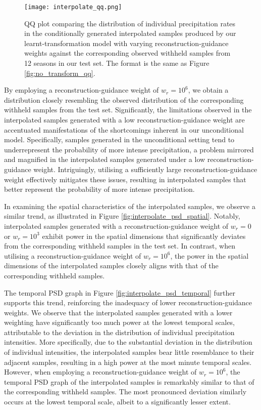 \documentclass[ oneside,%
                    author={George Herbert},
                    degree={MSci},
                     title={Diffusion Models for Time-Evolving Precipitation Fields},
                  subtitle={}]{dissertation}
\begin{document}
\begin{figure}[htbp]
      \centering
      \texttt{[image: interpolate\_qq.png]}
      \caption{QQ plot comparing the distribution of individual precipitation rates in the conditionally generated interpolated samples produced by our learnt-transformation model with varying reconstruction-guidance weights against the corresponding observed withheld samples from 12 seasons in our test set. The format is the same as Figure \ref{fig:no_transform_qq}.}
      \label{fig:interpolate_qq}
\end{figure}

By employing a reconstruction-guidance weight of $w_r=10^6$, we obtain a distribution closely resembling the observed distribution of the corresponding withheld samples from the test set. Significantly, the limitations observed in the interpolated samples generated with a low reconstruction-guidance weight are accentuated manifestations of the shortcomings inherent in our unconditional model. Specifically, samples generated in the unconditional setting tend to underrepresent the probability of more intense precipitation, a problem mirrored and magnified in the interpolated samples generated under a low reconstruction-guidance weight. Intriguingly, utilising a sufficiently large reconstruction-guidance weight effectively mitigates these issues, resulting in interpolated samples that better represent the probability of more intense precipitation.

In examining the spatial characteristics of the interpolated samples, we observe a similar trend, as illustrated in Figure \ref{fig:interpolate_psd_spatial}. Notably, interpolated samples generated with a reconstruction-guidance weight of $w_r=0$ or $w_r=10^3$ exhibit power in the spatial dimensions that significantly deviates from the corresponding withheld samples in the test set. In contrast, when utilising a reconstruction-guidance weight of $w_r=10^6$, the power in the spatial dimensions of the interpolated samples closely aligns with that of the corresponding withheld samples.

The temporal PSD graph in Figure \ref{fig:interpolate_psd_temporal} further supports this trend, reinforcing the inadequacy of lower reconstruction-guidance weights. We observe that the interpolated samples generated with a lower weighting have significantly too much power at the lowest temporal scales, attributable to the deviation in the distribution of individual precipitation intensities. More specifically, due to the substantial deviation in the distribution of individual intensities, the interpolated samples bear little resemblance to their adjacent samples, resulting in a high power at the most minute temporal scales. However, when employing a reconstruction-guidance weight of $w_r=10^6$, the temporal PSD graph of the interpolated samples is remarkably similar to that of the corresponding withheld samples. The most pronounced deviation similarly occurs at the lowest temporal scale, albeit to a significantly lesser extent.
\end{document}
